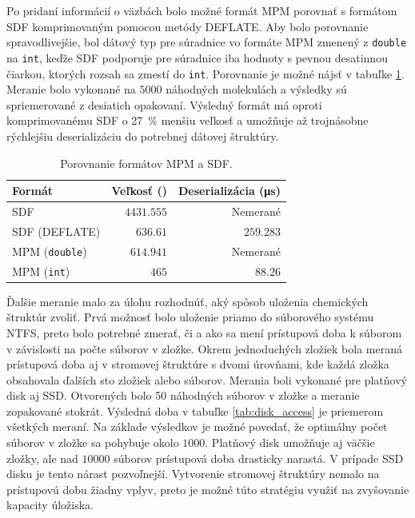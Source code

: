 \documentclass[slovak]{ExcelAtFIT} %
\begin{document}
Po pridaní informácií o väzbách bolo možné formát MPM porovnať s formátom SDF komprimovaným pomocou metódy DEFLATE. Aby bolo porovnanie spravodlivejšie, bol dátový typ pre súradnice vo formáte MPM zmenený z \texttt{double} na \texttt{int}, keďže SDF podporuje pre súradnice iba hodnoty s pevnou desatinnou čiarkou, ktorých rozsah sa zmestí do \texttt{int}. Porovnanie je možné nájsť v tabuľke \ref{tab:sdfvsmpm}. Meranie bolo vykonané na $5000$ náhodných molekulách a výsledky sú spriemerované z desiatich opakovaní. Výsledný formát má oproti komprimovanému SDF o \SI{27}{\percent} menšiu veľkosť a umožňuje až trojnásobne rýchlejšiu deserializáciu do potrebnej dátovej štruktúry.

\begin{table}[h]
	\vskip6pt
	\caption{Porovnanie formátov MPM a SDF.}
	\centering
	\begin{tabular}{l|r|r}
		\toprule
		Formát & Veľkosť (\si{\byte}) & Deserializácia (\si{\micro\second}) \\
		\midrule
		SDF & $4431.555$ & Nemerané \\
		SDF (DEFLATE) & $636.61$ & $259.283$ \\
		MPM (\texttt{double}) & $614.941$ & Nemerané \\
		MPM (\texttt{int}) & $465$ & $88.26$ \\
		\bottomrule
	\end{tabular}
	\label{tab:sdfvsmpm}
\end{table}

Ďalšie meranie malo za úlohu rozhodnúť, aký spô\-sob uloženia chemických štruktúr zvoliť. Prvá možnosť bolo uloženie priamo do súborového systému NTFS, preto bolo potrebné zmerať, či a ako sa mení prístupová doba k súborom v závislosti na počte súborov v zložke. Okrem jednoduchých zložiek bola meraná prístupová doba aj v stromovej štruktúre s dvomi úrovňami, kde každá zložka obsahovala ďalších sto zložiek alebo súborov. Merania boli vykonané pre platňový disk aj SSD. Otvorených bolo 50 náhodných súborov v zložke a meranie zopakované stokrát. Výsledná doba v tabuľke \ref{tab:disk_access} je priemerom všetkých meraní. Na základe výsledkov je možné povedať, že optimálny počet sú\-bo\-rov v zložke sa pohybuje okolo $1000$. Platňový disk u\-mož\-ňu\-je aj väčšie zložky, ale nad $10000$ súborov prístupová doba drasticky narastá. V prípade SSD disku je tento nárast pozvoľnejší. Vytvorenie stromovej štruktúry nemalo na prístupovú dobu žiadny vplyv, preto je možné túto stratégiu využiť na zvyšovanie kapacity úložiska. 
\end{document}
